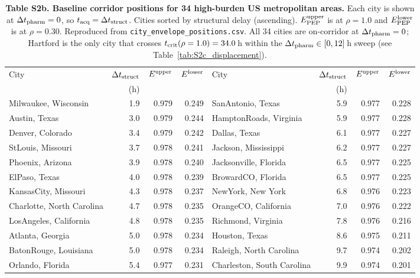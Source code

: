 \begin{table}[!htb]
\centering
\small
\caption{\textbf{Table S2b. Baseline corridor positions for 34 high-burden US
metropolitan areas.} Each city is shown at $\Delta t_{\rm pharm} = 0$, so
$t_{\rm acq} = \Delta t_{\rm struct}$. Cities sorted by structural delay
(ascending). $E_{\rm PEP}^{\rm upper}$ is at $\rho=1.0$ and
$E_{\rm PEP}^{\rm lower}$ is at $\rho=0.30$. Reproduced from
\texttt{city\_envelope\_positions.csv}. All 34 cities are on-corridor at
$\Delta t_{\rm pharm}=0$; Hartford is the only city that crosses
$t_{\rm crit}(\rho=1.0)=34.0$\,h within the $\Delta t_{\rm pharm} \in [0,12]$\,h
sweep (see Table~\ref{tab:S2c_displacement}).}
\label{tab:S2b_baseline}
\begin{tabular}{lrrr@{\hspace{1.2em}}lrrr}
\toprule
City & $\Delta t_{\rm struct}$ & $E^{\rm upper}$ & $E^{\rm lower}$ &
City & $\Delta t_{\rm struct}$ & $E^{\rm upper}$ & $E^{\rm lower}$ \\
 & (h) & & & & (h) & & \\
\midrule
  Milwaukee, Wisconsin & 1.9 & 0.979 & 0.249 & SanAntonio, Texas & 5.9 & 0.977 & 0.228 \\
  Austin, Texas & 3.0 & 0.979 & 0.244 & HamptonRoads, Virginia & 5.9 & 0.977 & 0.228 \\
  Denver, Colorado & 3.4 & 0.979 & 0.242 & Dallas, Texas & 6.1 & 0.977 & 0.227 \\
  StLouis, Missouri & 3.7 & 0.978 & 0.241 & Jackson, Mississippi & 6.2 & 0.977 & 0.227 \\
  Phoenix, Arizona & 3.9 & 0.978 & 0.240 & Jacksonville, Florida & 6.5 & 0.977 & 0.225 \\
  ElPaso, Texas & 4.0 & 0.978 & 0.239 & BrowardCO, Florida & 6.5 & 0.977 & 0.225 \\
  KansasCity, Missouri & 4.3 & 0.978 & 0.237 & NewYork, New York & 6.8 & 0.976 & 0.223 \\
  Charlotte, North Carolina & 4.7 & 0.978 & 0.235 & OrangeCO, California & 7.0 & 0.976 & 0.222 \\
  LosAngeles, California & 4.8 & 0.978 & 0.235 & Richmond, Virginia & 7.8 & 0.976 & 0.216 \\
  Atlanta, Georgia & 5.0 & 0.978 & 0.234 & Houston, Texas & 8.6 & 0.975 & 0.211 \\
  BatonRouge, Louisiana & 5.0 & 0.978 & 0.234 & Raleigh, North Carolina & 9.7 & 0.974 & 0.202 \\
  Orlando, Florida & 5.4 & 0.977 & 0.231 & Charleston, South Carolina & 9.9 & 0.974 & 0.201 \\

\end{tabular}
\end{table}
